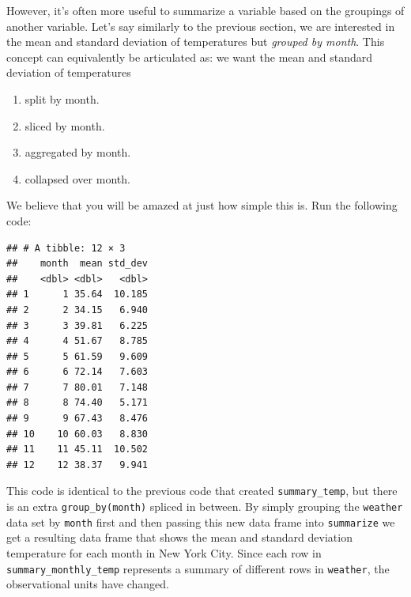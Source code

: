 \documentclass[]{tufte-book}
\newenvironment{Shaded}{\begin{snugshade}}{\end{snugshade}}
\newcommand{\KeywordTok}[1]{\textcolor[rgb]{0.13,0.29,0.53}{\textbf{{#1}}}}
\newcommand{\DataTypeTok}[1]{\textcolor[rgb]{0.13,0.29,0.53}{{#1}}}
\newcommand{\StringTok}[1]{\textcolor[rgb]{0.31,0.60,0.02}{{#1}}}
\newcommand{\OtherTok}[1]{\textcolor[rgb]{0.56,0.35,0.01}{{#1}}}
\newcommand{\NormalTok}[1]{{#1}}
\providecommand{\tightlist}{%
  \setlength{\itemsep}{0pt}\setlength{\parskip}{0pt}}
\begin{document}
However, it's often more useful to summarize a variable based on the
groupings of another variable. Let's say similarly to the previous
section, we are interested in the mean and standard deviation of
temperatures but \emph{grouped by month}. This concept can equivalently
be articulated as: we want the mean and standard deviation of
temperatures

\begin{enumerate}
\def\labelenumi{\arabic{enumi}.}
\tightlist
\item
  split by month.
\item
  sliced by month.
\item
  aggregated by month.
\item
  collapsed over month.
\end{enumerate}

We believe that you will be amazed at just how simple this is. Run the
following code:

\begin{Shaded}
\end{Shaded}

\begin{verbatim}
## # A tibble: 12 × 3
##    month  mean std_dev
##    <dbl> <dbl>   <dbl>
## 1      1 35.64  10.185
## 2      2 34.15   6.940
## 3      3 39.81   6.225
## 4      4 51.67   8.785
## 5      5 61.59   9.609
## 6      6 72.14   7.603
## 7      7 80.01   7.148
## 8      8 74.40   5.171
## 9      9 67.43   8.476
## 10    10 60.03   8.830
## 11    11 45.11  10.502
## 12    12 38.37   9.941
\end{verbatim}

This code is identical to the previous code that created
\texttt{summary\_temp}, but there is an extra \texttt{group\_by(month)}
spliced in between. By simply grouping the \texttt{weather} data set by
\texttt{month} first and then passing this new data frame into
\texttt{summarize} we get a resulting data frame that shows the mean and
standard deviation temperature for each month in New York City. Since
each row in \texttt{summary\_monthly\_temp} represents a summary of
different rows in \texttt{weather}, the observational units have
changed.
\end{document}
